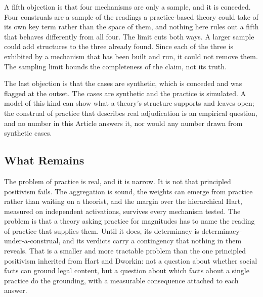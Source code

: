 A fifth objection is that four mechanisms are only a sample, and it is
conceded. Four construals are a sample of the readings a practice-based theory
could take of its own key term rather than the space of them, and nothing
here rules out a fifth that behaves differently from all four. The limit
cuts both ways. A larger sample could add structures to the three already found. Since each of the three is exhibited by a mechanism that has been built and
run, it could not remove them. The sampling limit bounds
the completeness of the claim, not its truth.

The last objection is that the cases are synthetic, which is conceded and was
flagged at the outset. The cases are synthetic and the practice is simulated. A model of this kind can show what a
theory's structure supports and leaves open; the construal of
practice that describes real adjudication is an empirical question, and no number in this Article answers it, nor would any number drawn from
synthetic cases.

\subsection*{What Remains}

The problem of practice is real, and it is narrow. It is not that
principled positivism fails. The aggregation is sound, the weights can emerge from practice rather than
waiting on a theorist, and the margin over the hierarchical Hart, measured on
independent activations, survives every mechanism tested. The problem is that a theory asking practice for magnitudes has to name the
reading of practice that supplies them. Until it does, its determinacy is
determinacy-under-a-construal, and its verdicts carry a contingency that
nothing in them reveals. That is a smaller and more
tractable problem than the one principled positivism inherited from Hart
and Dworkin: not a question about whether social facts can ground legal
content, but a question about which facts about a single practice do the
grounding, with a measurable consequence attached to each answer.
